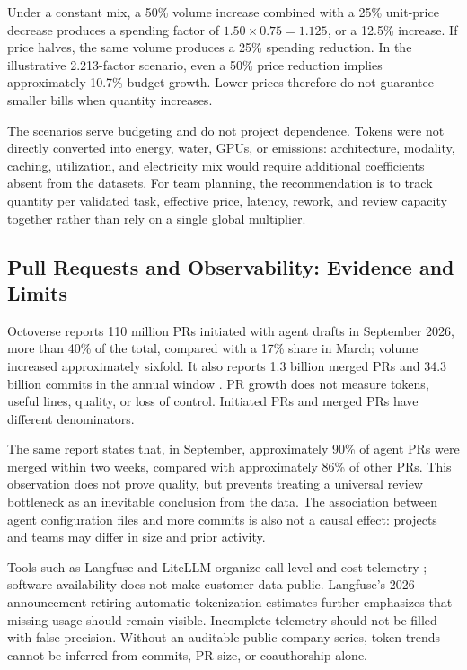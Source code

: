 \documentclass[11pt,a4paper]{article}
\begin{document}
Under a constant mix, a 50\% volume increase combined with a 25\% unit-price decrease produces a spending factor of $1.50\times0.75=1.125$, or a 12.5\% increase. If price halves, the same volume produces a 25\% spending reduction. In the illustrative 2.213-factor scenario, even a 50\% price reduction implies approximately 10.7\% budget growth. Lower prices therefore do not guarantee smaller bills when quantity increases.

The scenarios serve budgeting and do not project dependence. Tokens were not directly converted into energy, water, GPUs, or emissions: architecture, modality, caching, utilization, and electricity mix would require additional coefficients absent from the datasets. For team planning, the recommendation is to track quantity per validated task, effective price, latency, rework, and review capacity together rather than rely on a single global multiplier.

\subsection{Pull Requests and Observability: Evidence and Limits}
Octoverse reports 110 million PRs initiated with agent drafts in September 2026, more than 40\% of the total, compared with a 17\% share in March; volume increased approximately sixfold. It also reports 1.3 billion merged PRs and 34.3 billion commits in the annual window \cite{github2026}. PR growth does not measure tokens, useful lines, quality, or loss of control. Initiated PRs and merged PRs have different denominators.

The same report states that, in September, approximately 90\% of agent PRs were merged within two weeks, compared with approximately 86\% of other PRs. This observation does not prove quality, but prevents treating a universal review bottleneck as an inevitable conclusion from the data. The association between agent configuration files and more commits is also not a causal effect: projects and teams may differ in size and prior activity.

Tools such as Langfuse and LiteLLM organize call-level and cost telemetry \cite{langfuse2026,litellm2026}; software availability does not make customer data public. Langfuse's 2026 announcement retiring automatic tokenization estimates further emphasizes that missing usage should remain visible. Incomplete telemetry should not be filled with false precision. Without an auditable public company series, token trends cannot be inferred from commits, PR size, or coauthorship alone.
\end{document}
